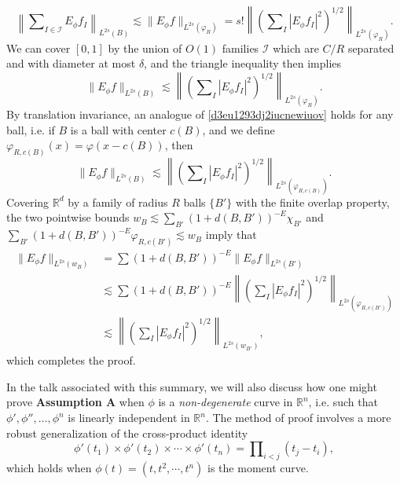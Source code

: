 \documentclass[12pt]{article}
\begin{document}
%
\begin{equation}
    \left\| \sum\nolimits_{I \in \mathcal{I}} E_\phi f_I \right\|_{L^{2s}(B)} \lesssim \| E_\phi f \|_{L^{2s}(\varphi_R)} = s! \left\| \left( \sum\nolimits_I |E_\phi f_I|^2 \right)^{1/2} \right\|_{L^{2s}(\varphi_R)}.
\end{equation}
%
We can cover $[0,1]$ by the union of $O(1)$ families $\mathcal{I}$ which are $C/R$ separated and with diameter at most $\delta$, and the triangle inequality then implies
%
\begin{equation} \label{d3eu1293dj2iucnewiuov}
    \| E_\phi f \|_{L^{2s}(B)} \lesssim \left\| \left( \sum\nolimits_I |E_\phi f_I|^2 \right)^{1/2} \right\|_{L^{2s}(\varphi_R)}.
\end{equation}
%
By translation invariance, an analogue of \eqref{d3eu1293dj2iucnewiuov} holds for any ball, i.e. if $B$ is a ball with center $c(B)$, and we define $\varphi_{R,c(B)}(x) = \varphi(x - c(B))$, then
%
\begin{equation}
    \| E_\phi f \|_{L^{2s}(B)} \lesssim \left\| \left( \sum\nolimits_I |E_\phi f_I|^2 \right)^{1/2} \right\|_{L^{2s}(\varphi_{R,c(B)})}.
\end{equation}
%
Covering $\mathbb{R}^d$ by a family of radius $R$ balls $\{ B' \}$ with the finite overlap property, the two pointwise bounds $w_B \lesssim \sum\nolimits_{B'} (1 + d(B,B'))^{-E} \chi_{B'}$ and $\sum\nolimits_{B'} (1 + d(B,B'))^{-E} \varphi_{R,c(B')} \lesssim w_{B}$ imply that
%
\begin{equation}
\begin{split}
    \| E_\phi f \|_{L^{2s}(w_B)} &= \sum (1 + d(B,B'))^{-E} \| E_\phi f \|_{L^{2s}(B')}\\
    &\lesssim \sum (1 + d(B,B'))^{-E} \left\| \left( \sum\nolimits_I |E_\phi f_I|^2 \right)^{1/2} \right\|_{L^{2s}(\varphi_{R,c(B')})}\\
    &\lesssim \left\| \left( \sum\nolimits_I |E_\phi f_I|^2 \right)^{1/2} \right\|_{L^{2s}(w_{B'})},
\end{split}
\end{equation}
which completes the proof.

In the talk associated with this summary, we will also discuss how one might prove \textbf{Assumption A} when $\phi$ is a \emph{non-degenerate} curve in $\mathbb{R}^n$, i.e. such that $\phi', \phi'', \dots, \phi^{n}$ is linearly independent in $\mathbb{R}^n$. The method of proof involves a more robust generalization of the cross-product identity
%
\begin{equation}
    \phi'(t_1) \times \phi'(t_2) \times \cdots \times \phi'(t_n) = \prod\nolimits_{i < j} (t_j - t_i),
\end{equation}
%
which holds when $\phi(t) = (t,t^2,\cdots,t^n)$ is the moment curve.
\end{document}
